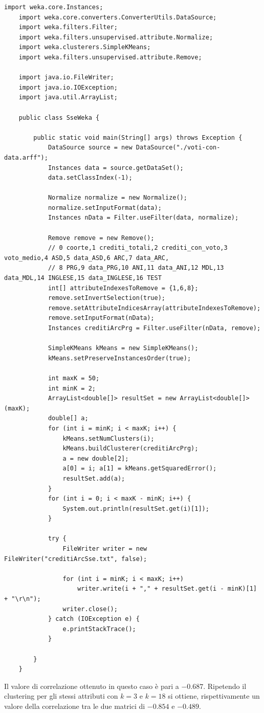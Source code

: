 \documentclass[12pt]{article}
\begin{document}
\begin{lstlisting}[caption={Codice Java per il calcolo di SSE al variare di K}, label={javasse}, captionpos=b, style = java]
	import weka.core.Instances;
	import weka.core.converters.ConverterUtils.DataSource;
	import weka.filters.Filter;
	import weka.filters.unsupervised.attribute.Normalize;
	import weka.clusterers.SimpleKMeans;
	import weka.filters.unsupervised.attribute.Remove;
	
	import java.io.FileWriter;
	import java.io.IOException;
	import java.util.ArrayList;
	
	public class SseWeka {
	
		public static void main(String[] args) throws Exception {
			DataSource source = new DataSource("./voti-con-data.arff");
			Instances data = source.getDataSet();
			data.setClassIndex(-1);
	
			Normalize normalize = new Normalize();
			normalize.setInputFormat(data);
			Instances nData = Filter.useFilter(data, normalize);
	
			Remove remove = new Remove();
			// 0 coorte,1 crediti_totali,2 crediti_con_voto,3 voto_medio,4 ASD,5 data_ASD,6 ARC,7 data_ARC,
			// 8 PRG,9 data_PRG,10 ANI,11 data_ANI,12 MDL,13 data_MDL,14 INGLESE,15 data_INGLESE,16 TEST
			int[] attributeIndexesToRemove = {1,6,8};
			remove.setInvertSelection(true);
			remove.setAttributeIndicesArray(attributeIndexesToRemove);
			remove.setInputFormat(nData);
			Instances creditiArcPrg = Filter.useFilter(nData, remove);
	
			SimpleKMeans kMeans = new SimpleKMeans();
			kMeans.setPreserveInstancesOrder(true);
	
			int maxK = 50;
			int minK = 2;
			ArrayList<double[]> resultSet = new ArrayList<double[]>(maxK);
			double[] a;
			for (int i = minK; i < maxK; i++) {
				kMeans.setNumClusters(i);
				kMeans.buildClusterer(creditiArcPrg);
				a = new double[2];
				a[0] = i; a[1] = kMeans.getSquaredError();
				resultSet.add(a);
			}
			for (int i = 0; i < maxK - minK; i++) {
				System.out.println(resultSet.get(i)[1]);
			}
	
			try {
				FileWriter writer = new FileWriter("creditiArcSse.txt", false);
	
				for (int i = minK; i < maxK; i++)
					writer.write(i + "," + resultSet.get(i - minK)[1] + "\r\n");
				writer.close();
			} catch (IOException e) {
				e.printStackTrace();
			}
	
		}
	}		
\end{lstlisting}
Il valore di correlazione ottenuto in questo caso è pari a $-0.687$.
Ripetendo il clustering per gli stessi attributi con $k=3$ e $k=18$ si ottiene, 
rispetti\-vamente un valore della correlazione tra le due matrici di $-0.854$ e $-0.489$. 
\end{document}
